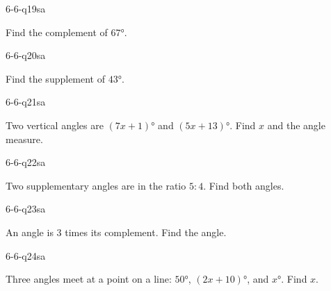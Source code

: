 
\begin{practiceQuestion}{6-6-q19}{sa}
\begin{questionText}
Find the complement of $67°$.
\end{questionText}
\end{practiceQuestion}

\begin{practiceQuestion}{6-6-q20}{sa}
\begin{questionText}
Find the supplement of $43°$.
\end{questionText}
\end{practiceQuestion}

\begin{practiceQuestion}{6-6-q21}{sa}
\begin{questionText}
Two vertical angles are $(7x + 1)°$ and $(5x + 13)°$. Find $x$ and the angle measure.
\end{questionText}
\end{practiceQuestion}

\begin{practiceQuestion}{6-6-q22}{sa}
\begin{questionText}
Two supplementary angles are in the ratio $5:4$. Find both angles.
\end{questionText}
\end{practiceQuestion}

\begin{practiceQuestion}{6-6-q23}{sa}
\begin{questionText}
An angle is $3$ times its complement. Find the angle.
\end{questionText}
\end{practiceQuestion}

\begin{practiceQuestion}{6-6-q24}{sa}
\begin{questionText}
Three angles meet at a point on a line: $50°$, $(2x + 10)°$, and $x°$. Find $x$.
\end{questionText}
\end{practiceQuestion}

